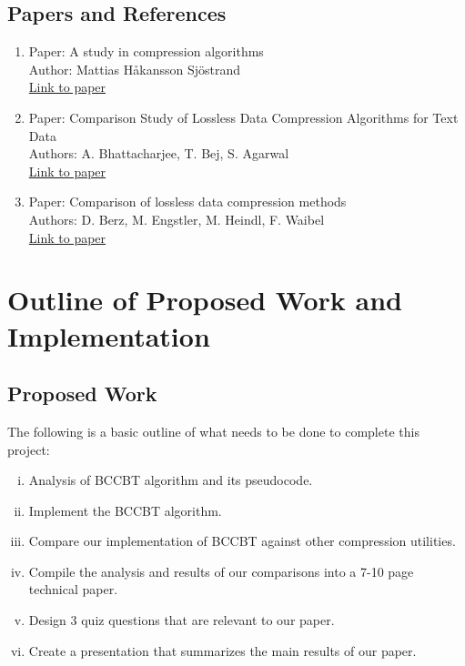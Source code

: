 \documentclass[11pt]{article}
\begin{document}
\subsection*{Papers and References}
\begin{enumerate}[(1)]
\item Paper: A study in compression algorithms \\
        Author: Mattias Håkansson Sjöstrand\\ 
        \href{http://bth.diva-portal.org/smash/record.jsf?faces-redirect=true&aq2=\%5B\%5B\%5D\%5D\&af=\%5B\%5D\&searchType=SIMPLE\&language=en\&pid=diva2\%3A830266\&aq=\%5B\%5B\%5D\%5D\&sf=all\&aqe=\%5B\%5D\&sortOrder=author\_sort\_asc\&onlyFullText=false\&noOfRows=50\&dswid=482}{Link to paper}
  
  \item Paper: Comparison Study of Lossless Data Compression Algorithms for Text Data \\
        Authors: A. Bhattacharjee, T. Bej, S. Agarwal\\ 
        \href{https://www.semanticscholar.org/paper/Comparison-Study-of-Lossless-Data-Compression-for-Bhattacharjee-Bej/ac777e46e7473c9e20ae94cceb58dcd4c058ce01}{Link to paper}
  
  \item Paper: Comparison of lossless data compression methods \\
        Authors: D. Berz, M. Engstler, M. Heindl, F. Waibel\\
        \href{https://www.researchgate.net/publication/335572104_Comparison_of_lossless_data_compression_methods}{Link to paper}
\end{enumerate}

\newpage
\section*{Outline of Proposed Work and Implementation}

\subsection*{Proposed Work}
The following is a basic outline of what needs to be done to complete this project:
      \begin{enumerate}[(i)]
            \item Analysis of BCCBT algorithm and its pseudocode.
            \item Implement the BCCBT algorithm. 
            \item Compare our implementation of BCCBT against other compression utilities.
            \item Compile the analysis and results of our comparisons into a 7-10 page technical paper.
            \item Design 3 quiz questions that are relevant to our paper.
            \item Create a presentation that summarizes the main results of our paper.
      \end{enumerate}
\end{document}
